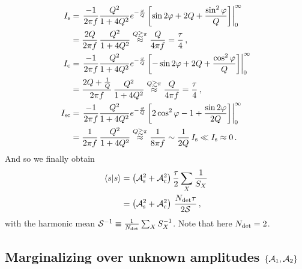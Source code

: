 \documentclass[aps,prd,onecolumn,nofootinbib,superscriptaddress,altaffilletter,floatfix]{revtex4-1}
\begin{document}
\begin{align}
  \label{eq:19}
  I_{\mathrm{s}} &= \left. \frac{-1}{2\pi f}\frac{Q^2}{1 + 4Q^2}e^{-\frac{\varphi}{Q}}\left[ \sin2\varphi + 2Q + \frac{\sin^2\varphi}{Q}\right]\right|_0^\infty\\
  &= \frac{2Q}{2\pi f}\,\frac{Q^2}{1+4Q^2} \stackrel{Q\gtrsim\pi}{\approx} \frac{Q}{4\pi f} = \frac{\tau}{4}\,,\\
  I_{\mathrm{c}} &= \left. \frac{-1}{2\pi f}\frac{Q^2}{1 + 4Q^2}e^{-\frac{\varphi}{Q}}\left[ -\sin2\varphi + 2Q + \frac{\cos^2\varphi}{Q}\right]\right|_0^\infty\\
  &= \frac{2Q + \frac{1}{Q}}{2\pi f}\,\frac{Q^2}{1+4Q^2} \stackrel{Q\gtrsim\pi}{\approx} \frac{Q}{4\pi f} = \frac{\tau}{4}\,,\\
  I_{\mathrm{sc}} &= \left. \frac{-1}{2\pi f}\frac{Q^2}{1 + 4Q^2}e^{-\frac{\varphi}{Q}}\left[ 2\cos^2\varphi - 1 + \frac{\sin2\varphi}{2Q}\right]\right|_0^\infty\\
  &= \frac{1}{2\pi f}\,\frac{Q^2}{1+4Q^2} \stackrel{Q\gtrsim\pi}{\approx} \frac{1}{8\pi f} \sim \frac{1}{2Q}\,I_{\mathrm{s}} \ll I_{\mathrm{s}} \approx 0\,.
\end{align}
And so we finally obtain
\begin{align}
  \label{eq:20}
  \langle s|s\rangle &= \left(\mathcal{A}_{\mathrm{s}}^2 + \mathcal{A}_{\mathrm{c}}^2\right)\frac{\tau}{2}\sum_X \frac{1}{S_X}\\
  &=\left(\mathcal{A}_{\mathrm{s}}^2 + \mathcal{A}_{\mathrm{c}}^2\right)\,\frac{N_{\mathrm{det}}\tau}{2\mathcal{S}}\,,
\end{align}
with the harmonic mean $\mathcal{S}^{-1} \equiv \frac{1}{N_{\mathrm{det}}}\sum_X S_X^{-1}$. Note that here $N_{\mathrm{det}} = 2$.


\subsection{Marginalizing over unknown amplitudes $\{\mathcal{A}_1,\mathcal{A}_2\}$}
\label{sec:marg-over-unkn}
\end{document}
